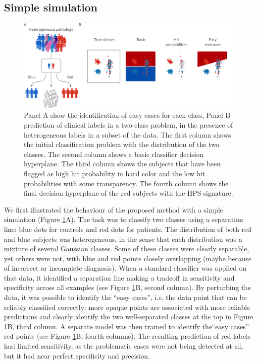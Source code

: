 \documentclass[authoryear]{elsarticle}
\begin{document}
\subsection*{Simple simulation}
\begin{figure}[ht]%
\begin{center}
\includegraphics[width=0.8\linewidth]{figures/toy_demo.png}
\end{center}
\caption[HPS identification]{Panel A show the identification of easy cases for each class, Panel B prediction of clinical labels in a two-class problem, in the presence of heterogeneous labels in a subset of the data. The first column shows the initial classification problem with the distribution of the two classes. The second column shows a basic classifier decision hyperplane. The third column shows the subjects that have been flagged as high hit probability in hard color and the low hit probabilities with some transparency. The fourth column shows the final decision hyperplane of the red subjects with the HPS signature.
}

\label{fig_biotype_modes_toy}
\end{figure}

We first illustrated the behaviour of the proposed method with a simple simulation (Figure \ref{fig_biotype_modes_toy}A). The task was to classify two classes using a separation line: blue dots for controls and red dots for patients. The distribution of both red and blue subjects was heterogeneous, in the sense that each distribution was a mixture of several Gaussian classes. Some of these classes were clearly separable, yet others were not, with blue and red points closely overlapping (maybe because of incorrect or incomplete diagnosis). When a standard classifier was applied on that data, it identified a separation line making a tradeoff in sensitivity and specificity across all examples (see Figure \ref{fig_biotype_modes_toy}B, second column). By perturbing the data, it was possible to identify the ``easy cases'', i.e. the data point that can be reliably classified correctly: more opaque points are associated with more reliable predictions and clearly identify the two well-separated classes at the top in Figure \ref{fig_biotype_modes_toy}B, third column. A separate model was then trained to identify the``easy cases'' red points (see Figure \ref{fig_biotype_modes_toy}B, fourth columns). The resulting prediction of red labels had limited sensitivity, as the problematic cases were not being detected at all, but it had near perfect specificity and precision. 
\end{document}
